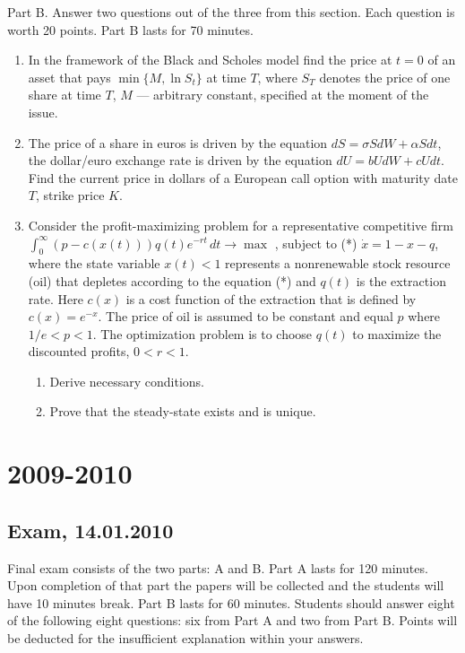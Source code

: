 \documentclass[pdftex,12pt,a4paper]{article}
\begin{document}
Part B.
Answer two questions out of the three from this section. Each question is worth 20 points.
Part B lasts for 70 minutes.

\begin{enumerate}
\item In the framework of the Black and Scholes model find the price at $t=0$  of an asset that pays $\min\{M,\ln S_t\}$  at time $T$, where $S_T$ denotes the price of one share at time $T$,  $M$ --- arbitrary constant, specified at the moment of the issue.

\item The price of a share in euros is driven by the equation $dS=\sigma S dW+\alpha S dt$, the dollar/euro exchange rate is driven by the equation $dU=b U dW+c U dt$. Find the current price in dollars of a European call option with maturity date $T$, strike price $K$.

\item Consider the profit-maximizing problem for a representative competitive firm 
$\int_0^{\infty} (p-c(x(t)))q(t)e^{-rt}\,dt \to \max$
, subject to (*) $\dot{x}=1-x-q$, where the state variable $x(t)<1$ represents a nonrenewable stock resource (oil) that depletes according to the equation (*) and $q(t)$ is the extraction rate. Here $c(x)$ is a cost function of the extraction that is defined by $c(x)=e^{-x}$. The price of oil is assumed to be constant and equal $p$ where $1/e<p<1$.  The optimization problem is to choose $q(t)$ to maximize the discounted profits, $0<r<1$.
\begin{enumerate}
\item Derive necessary conditions.
\item Prove that the steady-state exists and is unique. 
\end{enumerate} 

\end{enumerate}


\section{2009-2010}

\subsection{Exam, 14.01.2010}

Final exam consists of the two parts: A and B. Part A lasts for 120 minutes.
Upon completion of that part the papers will be collected and the students will have 10 minutes break. 
Part B lasts for 60 minutes.
Students should answer eight of the following eight questions: six from Part A and two from Part B. 
Points will be deducted for the insufficient explanation within your answers.
\end{document}
